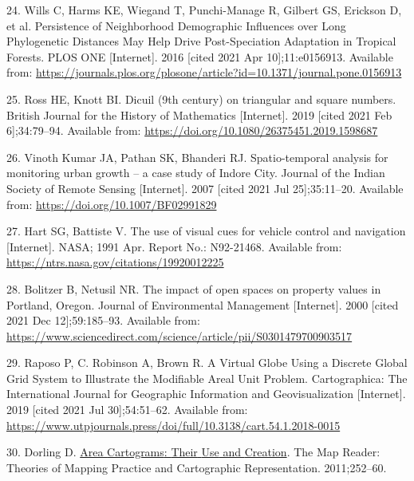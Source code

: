 \documentclass{josis}
\newlength{\cslhangindent}
\newenvironment{CSLReferences}[2] %
 {%
  \setlength{\parindent}{0pt}
  \ifodd #1 \everypar{\setlength{\hangindent}{\cslhangindent}}\ignorespaces\fi
  \ifnum #2 > 0
  \setlength{\parskip}{#2\baselineskip}
  \fi
 }%
 {}
\begin{document}
\begin{CSLReferences}{0}{0}
\leavevmode{}%
24. Wills C, Harms KE, Wiegand T, Punchi-Manage R, Gilbert GS, Erickson D, et al. Persistence of {Neighborhood} {Demographic} {Influences} over {Long} {Phylogenetic} {Distances} {May} {Help} {Drive} {Post}-{Speciation} {Adaptation} in {Tropical} {Forests}. PLOS ONE {[}Internet{]}. 2016 {[}cited 2021 Apr 10{]};11:e0156913. Available from: \url{https://journals.plos.org/plosone/article?id=10.1371/journal.pone.0156913}

\leavevmode{}%
25. Ross HE, Knott BI. Dicuil (9th century) on triangular and square numbers. British Journal for the History of Mathematics {[}Internet{]}. 2019 {[}cited 2021 Feb 6{]};34:79--94. Available from: \url{https://doi.org/10.1080/26375451.2019.1598687}

\leavevmode{}%
26. Vinoth Kumar JA, Pathan SK, Bhanderi RJ. Spatio-temporal analysis for monitoring urban growth -- a case study of {Indore} {City}. Journal of the Indian Society of Remote Sensing {[}Internet{]}. 2007 {[}cited 2021 Jul 25{]};35:11--20. Available from: \url{https://doi.org/10.1007/BF02991829}

\leavevmode{}%
27. Hart SG, Battiste V. The use of visual cues for vehicle control and navigation {[}Internet{]}. NASA; 1991 Apr. Report No.: N92-21468. Available from: \url{https://ntrs.nasa.gov/citations/19920012225}

\leavevmode{}%
28. Bolitzer B, Netusil NR. The impact of open spaces on property values in {Portland}, {Oregon}. Journal of Environmental Management {[}Internet{]}. 2000 {[}cited 2021 Dec 12{]};59:185--93. Available from: \url{https://www.sciencedirect.com/science/article/pii/S0301479700903517}

\leavevmode{}%
29. Raposo P, C. Robinson A, Brown R. A {Virtual} {Globe} {Using} a {Discrete} {Global} {Grid} {System} to {Illustrate} the {Modifiable} {Areal} {Unit} {Problem}. Cartographica: The International Journal for Geographic Information and Geovisualization {[}Internet{]}. 2019 {[}cited 2021 Jul 30{]};54:51--62. Available from: \url{https://www.utpjournals.press/doi/full/10.3138/cart.54.1.2018-0015}

\leavevmode{}%
30. Dorling D. \href{https://doi.org/bmhcfj}{Area {Cartograms}: {Their} {Use} and {Creation}}. The Map Reader: Theories of Mapping Practice and Cartographic Representation. 2011;252--60.


\end{CSLReferences}
\end{document}
